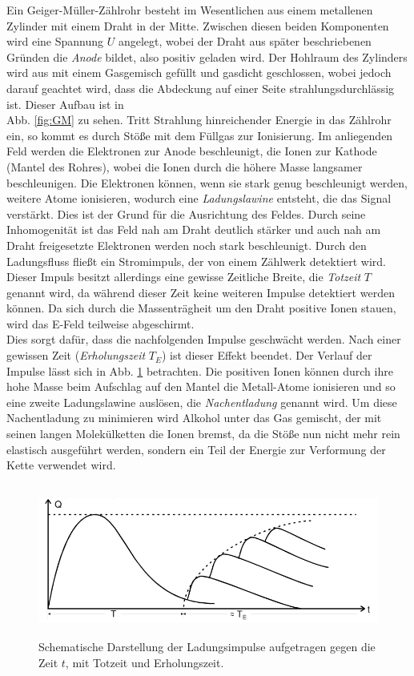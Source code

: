 Ein Geiger-Müller-Zählrohr besteht im Wesentlichen aus einem metallenen Zylinder mit einem Draht in der Mitte. Zwischen diesen beiden Komponenten wird eine Spannung $U$ angelegt, wobei der Draht aus später beschriebenen Gründen die \textit{Anode} bildet, also positiv geladen wird. Der Hohlraum des Zylinders wird aus mit einem Gasgemisch gefüllt und gasdicht geschlossen, wobei jedoch darauf geachtet wird, dass die Abdeckung auf einer Seite strahlungsdurchlässig ist. Dieser Aufbau ist in \\Abb. \ref{fig:GM} zu sehen. Tritt Strahlung hinreichender Energie in das Zählrohr ein, so kommt es durch Stöße mit dem Füllgas zur Ionisierung. Im anliegenden Feld werden die Elektronen zur Anode beschleunigt, die Ionen zur Kathode (Mantel des Rohres), wobei die Ionen durch die höhere Masse langsamer beschleunigen. Die Elektronen können, wenn sie stark genug beschleunigt werden, weitere Atome ionisieren, wodurch eine \textit{Ladungslawine} entsteht, die das Signal verstärkt. Dies ist der Grund für die Ausrichtung des Feldes. Durch seine Inhomogenität ist das Feld nah am Draht deutlich stärker und auch nah am Draht freigesetzte Elektronen werden noch stark beschleunigt. Durch den Ladungsfluss fließt ein Stromimpuls, der von einem Zählwerk detektiert wird.
Dieser Impuls besitzt allerdings eine gewisse Zeitliche Breite, die \textit{Totzeit} $T$ genannt wird, da während dieser Zeit keine weiteren Impulse detektiert werden können. Da sich durch die Massenträgheit um den Draht positive Ionen stauen, wird das E-Feld teilweise abgeschirmt. \\Dies sorgt dafür, dass die nachfolgenden Impulse geschwächt werden. Nach einer gewissen Zeit (\textit{Erholungszeit} $T_E$) ist dieser Effekt beendet. Der Verlauf der Impulse lässt sich in Abb. \ref{fig:GM-Zeit} betrachten. Die positiven Ionen können durch ihre hohe Masse beim Aufschlag auf den Mantel die Metall-Atome ionisieren und so eine zweite Ladungslawine auslösen, die \textit{Nachentladung} genannt wird. Um  diese Nachentladung zu minimieren wird Alkohol unter das Gas gemischt, der mit seinen langen Molekülketten die Ionen bremst, da die Stöße nun nicht mehr rein elastisch ausgeführt werden, sondern ein Teil der Energie zur Verformung der Kette verwendet wird.

\begin{figure}
  \centering
  \includegraphics[height=5cm]{./logos/GM-Zeit.PNG}
  \caption{Schematische Darstellung der Ladungsimpulse aufgetragen gegen die Zeit $t$, mit Totzeit und Erholungszeit. \cite{Anleitung}}
  \label{fig:GM-Zeit}
\end{figure}

